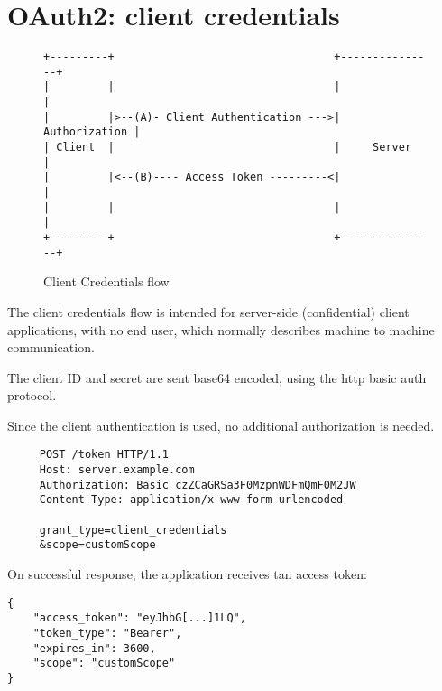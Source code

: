 \section{OAuth2: client credentials}
\label{sec:client-credentials}
\begin{figure}[h]
    \centering
    \begin{BVerbatim}
+---------+                                  +---------------+
|         |                                  |               |
|         |>--(A)- Client Authentication --->| Authorization |
| Client  |                                  |     Server    |
|         |<--(B)---- Access Token ---------<|               |
|         |                                  |               |
+---------+                                  +---------------+
    \end{BVerbatim}
    \caption{Client Credentials flow}
    \label{fig:grant-client-credentials}
\end{figure}
The client credentials flow is intended for server-side (confidential) client
applications, with no end user, which normally describes machine to machine
communication.

The client ID and secret are sent base64 encoded, using the http basic
auth protocol.

Since the client authentication is used, no additional authorization is needed.

\begin{lstlisting}
     POST /token HTTP/1.1
     Host: server.example.com
     Authorization: Basic czZCaGRSa3F0MzpnWDFmQmF0M2JW
     Content-Type: application/x-www-form-urlencoded

     grant_type=client_credentials
     &scope=customScope
\end{lstlisting}

On successful response, the application receives tan access token:
\begin{lstlisting}
{
    "access_token": "eyJhbG[...]1LQ",
    "token_type": "Bearer",
    "expires_in": 3600,
    "scope": "customScope"
}
\end{lstlisting}

